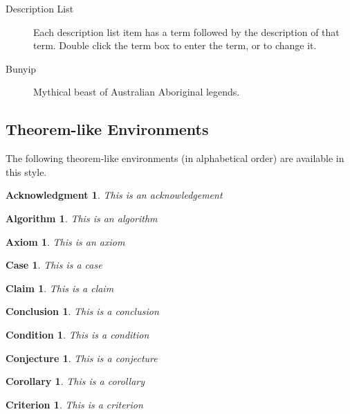 \documentclass[11pt,a4paper]{amsart}
\theoremstyle{plain}
\newtheorem{acknowledgement}{Acknowledgment}
\newtheorem{algorithm}{Algorithm}
\newtheorem{axiom}{Axiom}
\newtheorem{case}{Case}
\newtheorem{claim}{Claim}
\newtheorem{conclusion}{Conclusion}
\newtheorem{condition}{Condition}
\newtheorem{conjecture}{Conjecture}
\newtheorem{corollary}{Corollary}
\newtheorem{criterion}{Criterion}
\numberwithin{equation}{section}
\theoremstyle{definition}
\begin{document}
\begin{description}
\item[Description List] Each description list item has a term followed by the
description of that term. Double click the term box to enter the term, or to
change it.

\item[Bunyip] Mythical beast of Australian Aboriginal legends.
\end{description}

\subsection{Theorem-like Environments}

The following theorem-like environments (in alphabetical order) are available
in this style.

\begin{acknowledgement}
This is an acknowledgement
\end{acknowledgement}

\begin{algorithm}
This is an algorithm
\end{algorithm}

\begin{axiom}
This is an axiom
\end{axiom}

\begin{case}
This is a case
\end{case}

\begin{claim}
This is a claim
\end{claim}

\begin{conclusion}
This is a conclusion
\end{conclusion}

\begin{condition}
This is a condition
\end{condition}

\begin{conjecture}
This is a conjecture
\end{conjecture}

\begin{corollary}
This is a corollary
\end{corollary}

\begin{criterion}
This is a criterion
\end{criterion}
\end{document}
